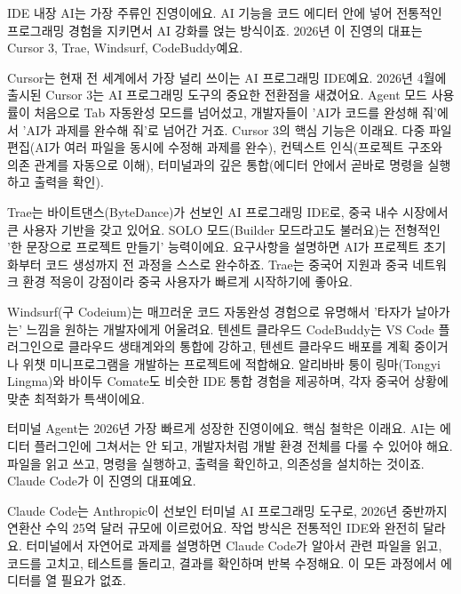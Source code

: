 
IDE 내장 AI는 가장 주류인 진영이에요. AI 기능을 코드 에디터 안에 넣어 전통적인 프로그래밍 경험을 지키면서 AI 강화를 얹는 방식이죠. 2026년 이 진영의 대표는 Cursor 3, Trae, Windsurf, CodeBuddy예요.


Cursor는 현재 전 세계에서 가장 널리 쓰이는 AI 프로그래밍 IDE예요. 2026년 4월에 출시된 Cursor 3는 AI 프로그래밍 도구의 중요한 전환점을 새겼어요. Agent 모드 사용률이 처음으로 Tab 자동완성 모드를 넘어섰고, 개발자들이 'AI가 코드를 완성해 줘'에서 'AI가 과제를 완수해 줘'로 넘어간 거죠. Cursor 3의 핵심 기능은 이래요. 다중 파일 편집(AI가 여러 파일을 동시에 수정해 과제를 완수), 컨텍스트 인식(프로젝트 구조와 의존 관계를 자동으로 이해), 터미널과의 깊은 통합(에디터 안에서 곧바로 명령을 실행하고 출력을 확인).


Trae는 바이트댄스(ByteDance)가 선보인 AI 프로그래밍 IDE로, 중국 내수 시장에서 큰 사용자 기반을 갖고 있어요. SOLO 모드(Builder 모드라고도 불러요)는 전형적인 '한 문장으로 프로젝트 만들기' 능력이에요. 요구사항을 설명하면 AI가 프로젝트 초기화부터 코드 생성까지 전 과정을 스스로 완수하죠. Trae는 중국어 지원과 중국 네트워크 환경 적응이 강점이라 중국 사용자가 빠르게 시작하기에 좋아요.


Windsurf(구 Codeium)는 매끄러운 코드 자동완성 경험으로 유명해서 '타자가 날아가는' 느낌을 원하는 개발자에게 어울려요. 텐센트 클라우드 CodeBuddy는 VS Code 플러그인으로 클라우드 생태계와의 통합에 강하고, 텐센트 클라우드 배포를 계획 중이거나 위챗 미니프로그램을 개발하는 프로젝트에 적합해요. 알리바바 퉁이 링마(Tongyi Lingma)와 바이두 Comate도 비슷한 IDE 통합 경험을 제공하며, 각자 중국어 상황에 맞춘 최적화가 특색이에요.


터미널 Agent는 2026년 가장 빠르게 성장한 진영이에요. 핵심 철학은 이래요. AI는 에디터 플러그인에 그쳐서는 안 되고, 개발자처럼 개발 환경 전체를 다룰 수 있어야 해요. 파일을 읽고 쓰고, 명령을 실행하고, 출력을 확인하고, 의존성을 설치하는 것이죠. Claude Code가 이 진영의 대표예요.


Claude Code는 Anthropic이 선보인 터미널 AI 프로그래밍 도구로, 2026년 중반까지 연환산 수익 25억 달러 규모에 이르렀어요. 작업 방식은 전통적인 IDE와 완전히 달라요. 터미널에서 자연어로 과제를 설명하면 Claude Code가 알아서 관련 파일을 읽고, 코드를 고치고, 테스트를 돌리고, 결과를 확인하며 반복 수정해요. 이 모든 과정에서 에디터를 열 필요가 없죠.

